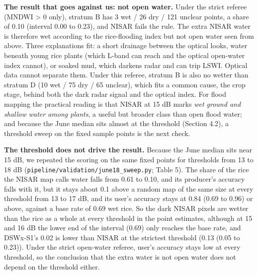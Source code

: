 \documentclass[10pt,twocolumn]{article}
\begin{document}
\textbf{The result that goes against us: not open water.} Under the strict referee (MNDWI > 0 only), stratum B has 3 wet / 26 dry / 121 unclear points, a share of 0.10 (interval 0.00 to 0.23), and NISAR fails the rule. The extra NISAR water is therefore wet according to the rice-flooding index but not open water seen from above. Three explanations fit: a short drainage between the optical looks, water beneath young rice plants (which L-band can reach and the optical open-water index cannot), or soaked mud, which darkens radar and can trip LSWI. Optical data cannot separate them. Under this referee, stratum B is also no wetter than stratum D (10 wet / 75 dry / 65 unclear), which fits a common cause, the crop stage, behind both the dark radar signal and the optical index. For flood mapping the practical reading is that NISAR at \textminus{}15 dB marks \emph{wet ground and shallow water among plants}, a useful but broader class than open flood water; and because the June median sits almost at the threshold (Section 4.2), a threshold sweep on the fixed sample points is the next check.

\textbf{The threshold does not drive the result.} Because the June median sits near \textminus{}15 dB, we repeated the scoring on the same fixed points for thresholds from \textminus{}13 to \textminus{}18 dB (\texttt{pipeline/\allowbreak{}validation/\allowbreak{}june18\_\allowbreak{}sweep.\allowbreak{}py}; Table 5). The share of the rice the NISAR map calls water falls from 0.61 to 0.10, and its producer's accuracy falls with it, but it stays about 0.1 above a random map of the same size at every threshold from \textminus{}13 to \textminus{}17 dB, and its user's accuracy stays at 0.84 (0.69 to 0.96) or above, against a base rate of 0.69 wet rice. So the dark NISAR pixels are wetter than the rice as a whole at every threshold in the point estimates, although at \textminus{}15 and \textminus{}16 dB the lower end of the interval (0.69) only reaches the base rate, and DSWx-S1's 0.02 is lower than NISAR at the strictest threshold (0.13 (0.05 to 0.23)). Under the strict open-water referee, user's accuracy stays low at every threshold, so the conclusion that the extra water is not open water does not depend on the threshold either.
\end{document}
